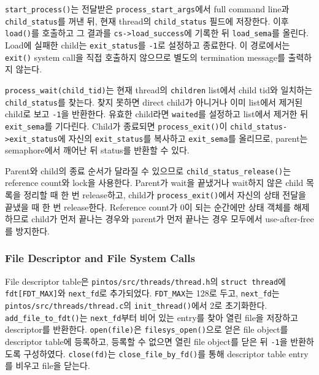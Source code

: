 \documentclass[conference]{IEEEtran}
\newcommand{\codefont}[1]{\texttt{\color{darkmagenta}#1}}
\begin{document}
\codefont{start\_process()}는 전달받은 \codefont{process\_start\_args}에서 full command line과 \codefont{child\_status}를 꺼낸 뒤, 현재 thread의 \codefont{child\_status} 필드에 저장한다. 이후 \codefont{load()}를 호출하고 그 결과를 \codefont{cs-\textgreater{}load\_success}에 기록한 뒤 \codefont{load\_sema}를 올린다. Load에 실패한 child는 \codefont{exit\_status}를 \codefont{-1}로 설정하고 종료한다. 이 경로에서는 \codefont{exit()} system call을 직접 호출하지 않으므로 별도의 termination message를 출력하지 않는다.

\codefont{process\_wait(child\_tid)}는 현재 thread의 \codefont{children} list에서 child tid와 일치하는 \codefont{child\_status}를 찾는다. 찾지 못하면 direct child가 아니거나 이미 list에서 제거된 child로 보고 \codefont{-1}을 반환한다. 유효한 child라면 \codefont{waited}를 설정하고 list에서 제거한 뒤 \codefont{exit\_sema}를 기다린다. Child가 종료되면 \codefont{process\_exit()}이 \codefont{child\_status-\textgreater{}exit\_status}에 자신의 \codefont{exit\_status}를 복사하고 \codefont{exit\_sema}를 올리므로, parent는 semaphore에서 깨어난 뒤 status를 반환할 수 있다.

Parent와 child의 종료 순서가 달라질 수 있으므로 \codefont{child\_status\_release()}는 reference count와 lock을 사용한다. Parent가 wait을 끝냈거나 wait하지 않은 child 목록을 정리할 때 한 번 release하고, child가 \codefont{process\_exit()}에서 자신의 상태 전달을 끝냈을 때 한 번 release한다. Reference count가 0이 되는 순간에만 상태 객체를 해제하므로 child가 먼저 끝나는 경우와 parent가 먼저 끝나는 경우 모두에서 use-after-free를 방지한다.

\subsubsection{File Descriptor and File System Calls}

File descriptor table은 \codefont{pintos/src/threads/thread.h}의 \codefont{struct thread}에 \codefont{fdt[FDT\_MAX]}와 \codefont{next\_fd}로 추가되었다. \codefont{FDT\_MAX}는 128로 두고, \codefont{next\_fd}는 \codefont{pintos/src/threads/thread.c}의 \codefont{init\_thread()}에서 2로 초기화한다. \codefont{add\_file\_to\_fdt()}는 \codefont{next\_fd}부터 비어 있는 entry를 찾아 열린 file을 저장하고 descriptor를 반환한다. \codefont{open(file)}은 \codefont{filesys\_open()}으로 얻은 file object를 descriptor table에 등록하고, 등록할 수 없으면 열린 file object를 닫은 뒤 \codefont{-1}을 반환하도록 구성하였다. \codefont{close(fd)}는 \codefont{close\_file\_by\_fd()}를 통해 descriptor table entry를 비우고 file을 닫는다.
\end{document}
